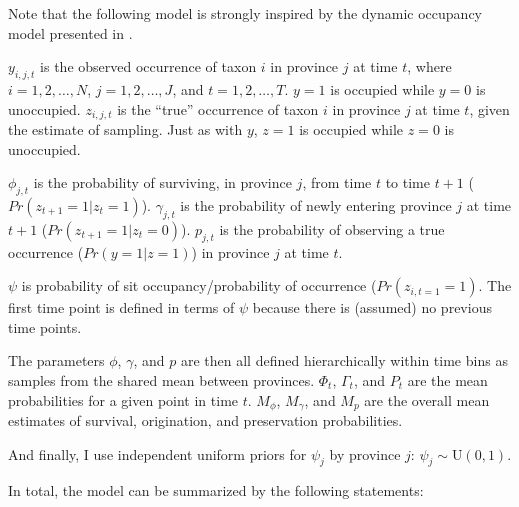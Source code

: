 \documentclass[12pt,letterpaper]{article}
\begin{document}
Note that the following model is strongly inspired by the dynamic occupancy model presented in \citep{Royle2008}.

\(y_{i, j, t}\) is the observed occurrence of taxon \(i\) in province \(j\) at time \(t\), where \(i = 1, 2, \dots, N\), \(j = 1, 2, \dots, J\), and \(t = 1, 2, \dots, T\). \(y = 1\) is occupied while \(y = 0\) is unoccupied. \(z_{i, j, t}\) is the ``true'' occurrence of taxon \(i\) in province \(j\) at time \(t\), given the estimate of sampling. Just as with \(y\), \(z = 1\) is occupied while \(z = 0\) is unoccupied. 

\(\phi_{j, t}\) is the probability of surviving, in province \(j\), from time \(t\) to time \(t + 1\) (\(Pr(z_{t + 1} = 1 | z_{t} = 1)\)). \(\gamma_{j, t}\) is the probability of newly entering province \(j\) at time \(t + 1\) (\(Pr(z_{t + 1} = 1 | z_{t} = 0)\)). \(p_{j, t}\) is the probability of observing a true occurrence (\(Pr(y = 1 | z = 1)\)) in province \(j\) at time \(t\). 

\(\psi\) is probability of sit occupancy/probability of occurrence (\(Pr(z_{i, t = 1} = 1)\). The first time point is defined in terms of \(\psi\) because there is (assumed) no previous time points.

The parameters \(\phi\), \(\gamma\), and \(p\) are then all defined hierarchically within time bins as samples from the shared mean between provinces. \(\Phi_{t}\), \(\Gamma_{t}\), and \(P_{t}\) are the mean probabilities for a given point in time \(t\). \(M_{\phi}\), \(M_{\gamma}\), and \(M_{p}\) are the overall mean estimates of survival, origination, and preservation probabilities. 

And finally, I use independent uniform priors for \(\psi_{j}\) by province \(j\): \(\psi_{j} \sim \mathrm{U}(0, 1)\).

In total, the model can be summarized by the following statements:
\end{document}
